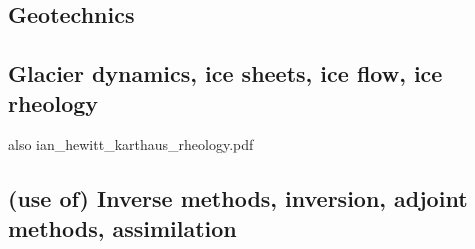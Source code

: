 \subsection{Geotechnics}

{\scriptsize
\noindent
\cite{ster99}
\cite{gora03}
\cite{zhll03}
\cite{gour04}
\cite{gork06}
\cite{bufy14}
}

\subsection{Glacier dynamics, ice sheets, ice flow, ice rheology}

{\scriptsize
\noindent
\cite{buja89}
\cite{vawh90}
\cite{wizh94}
\cite{grev97}
\cite{goko01}
\cite{frmm04}
\cite{asbl06}\cite{frmm06}
\cite{susp07}\cite{zwgg07}
\cite{zhjg11}
\cite{pode12}
\cite{raab13}
\cite{lejx14}\cite{moad14}
\cite{issg15}\cite{frlg15}
\cite{krab16}\cite{daws16}
\cite{lolc17}\cite{gors17}
\cite{heah18}\cite{mimr18}
\cite{kudd19}\cite{kuwd19}\cite{kuiper19}
}
also ian\_hewitt\_karthaus\_rheology.pdf

\subsection{(use of) Inverse methods, inversion, adjoint methods, assimilation}

